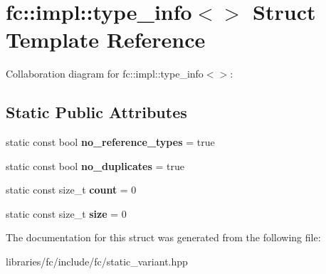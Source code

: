 \hypertarget{structfc_1_1impl_1_1type__info_3_4}{}\section{fc\+:\+:impl\+:\+:type\+\_\+info$<$$>$ Struct Template Reference}
\label{structfc_1_1impl_1_1type__info_3_4}


Collaboration diagram for fc\+:\+:impl\+:\+:type\+\_\+info$<$$>$\+:
\subsection*{Static Public Attributes}
\begin{DoxyCompactItemize}
\item 
\mbox{\label{structfc_1_1impl_1_1type__info_3_4_ad0185e0d58852878074ba9bfdb033574}} 
static const bool {\bfseries no\+\_\+reference\+\_\+types} = true
\item 
\mbox{\label{structfc_1_1impl_1_1type__info_3_4_a5084476a626d2c02cfd13b89f9e76e09}} 
static const bool {\bfseries no\+\_\+duplicates} = true
\item 
\mbox{\label{structfc_1_1impl_1_1type__info_3_4_ab0d3e17b90dd741d39414b3ae2fbec58}} 
static const size\+\_\+t {\bfseries count} = 0
\item 
\mbox{\label{structfc_1_1impl_1_1type__info_3_4_af9834c5e8898614c7b2b8708946e6ca2}} 
static const size\+\_\+t {\bfseries size} = 0
\end{DoxyCompactItemize}


The documentation for this struct was generated from the following file\+:\begin{DoxyCompactItemize}
\item 
libraries/fc/include/fc/static\+\_\+variant.\+hpp\end{DoxyCompactItemize}
